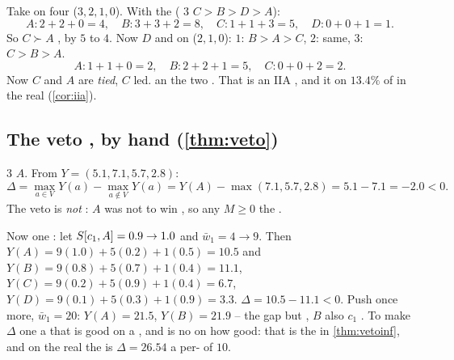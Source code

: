 Take   on four  ($3,2,1,0$). With the   
( $3$  $C\!>\!B\!>\!D\!>\!A$):
\[
A: 2+2+0=4,\quad B: 3+3+2=8,\quad C: 1+1+3=5,\quad D: 0+0+1=1 .
\]
So $C \succ A$ , by $5$ to $4$. Now  $D$ and  on 
 ($2,1,0$):  $1$: $B\!>\!A\!>\!C$,  $2$: same, 
$3$: $C\!>\!B\!>\!A$.
\[
A: 1+1+0=2,\quad B: 2+2+1=5,\quad C: 0+0+2=2 .
\]
Now $C$ and $A$ are \emph{tied},   $C$ led.  an 
    the   two . That is an IIA
, and it  on $13.4\%$ of  in the real 
(\cref{cor:iia}).

\subsection{The veto , by hand (\cref{thm:veto})}

 $3$  $A$. From $Y=(5.1,7.1,5.7,2.8)$:
\[
\Delta = \max_{a\in V}Y(a) - \max_{a\notin V}Y(a) = Y(A) - \max(7.1,5.7,2.8) = 5.1-7.1 = -2.0 < 0 .
\]
The veto is \emph{not }: $A$ was not  to win , so any $M\ge 0$
 the .

Now  one : let $S[c_1,A]=0.9 \to 1.0$ and $\bar w_1 = 4 \to 9$.
Then $Y(A) = 9(1.0)+5(0.2)+1(0.5) = 10.5$ and
$Y(B) = 9(0.8)+5(0.7)+1(0.4)=11.1$, $Y(C)=9(0.2)+5(0.9)+1(0.4)=6.7$,
$Y(D)=9(0.1)+5(0.3)+1(0.9)=3.3$.  $\Delta = 10.5-11.1 <0$. Push once more,
$\bar w_1 = 20$: $Y(A)=21.5$, $Y(B)=21.9$ -- the gap  but  ,
 $B$ also  $c_1$ . To make $\Delta$  one  a 
 that is \emph{} good on a   , and 
is no  on how good: that is  the  in
\cref{thm:vetoinf}, and on the real  the   is
$\Delta = 26.54$  a per-  of $10$.

